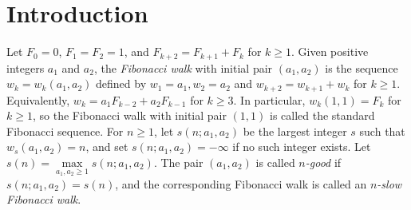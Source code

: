 \documentclass[11pt]{amsart}
\theoremstyle{definition}
\begin{document}
\begin{abstract}
Let $F_1=F_2=1$ and $F_{t+2}=F_{t+1}+F_t$ for $t\geq1$. For every $n\geq2$, there are unique integers $a,b,t$ such that $n=aF_t+bF_{t-1}$ with $t\geq2$ and $1\leq a\leq b\leq F_t$. The Fibonacci walk with initial pair $(b,a)$ reaches $n$ as late as possible, and the term following $n$ in this walk is $\lfloor\phi n\rfloor$ when $t$ is even and $\lceil\phi n\rceil$ when $t$ is odd, where $\phi=(1+\sqrt5)/2$. Let $D=\{d_1<d_2<\cdots\}$ and $U=\{u_1<u_2<\cdots\}$ be the sets corresponding to even and odd $t$, respectively. For $\ell,m\geq1$, define $D_\ell=\{d_{k+\ell}-d_k:k\geq1\}$, $U_\ell=\{u_{k+\ell}-u_k:k\geq1\}$, $D_\ell(m)=\{d_k:d_{k+\ell}-d_k=m\}$ and $U_\ell(m)=\{u_k:u_{k+\ell}-u_k=m\}$. Chung, Graham and Spiro conjectured that $D_\ell=U_\ell$ for all $\ell$, and asked for the densities of $D_\ell(m)$ and $U_\ell(m)$, especially when $\ell=1$. In this paper, we determine the third and fourth order gap spectra, and show that the conjecture holds for $\ell=3$ but fails for $\ell=4$. We also answer their density question by characterizing when $D_\ell(m)$ and $U_\ell(m)$ have natural densities and proving that their logarithmic densities always exist and are equal. For $\ell=1$, we give the exact logarithmic densities.

: Fibonacci sequence; slow Fibonacci walk; density\\
: 11B39; 11B05
\end{abstract}	

\maketitle
\pagestyle{plain}
\thispagestyle{plain}




\section{Introduction}
Let $F_0=0$, $F_1=F_2=1$, and $F_{k+2}=F_{k+1}+F_k$ for $k\geq1$. Given positive integers $a_1$ and $a_2$, the \emph{Fibonacci walk} with initial pair $(a_1,a_2)$ is the sequence $w_k=w_k(a_1,a_2)$ defined by $w_1=a_1,w_2=a_2$ and $w_{k+2}=w_{k+1}+w_k$ for $k\geq1$. Equivalently, $w_k=a_1F_{k-2}+a_2F_{k-1}$ for $k\geq3$. In particular, $w_k(1,1)=F_k$ for $k\geq1$, so the Fibonacci walk with initial pair $(1,1)$ is called the standard Fibonacci sequence. For $n\geq1$, let $s(n;a_1,a_2)$ be the largest integer $s$ such that $w_s(a_1,a_2)=n$, and set $s(n;a_1,a_2)=-\infty$ if no such integer exists. Let $s(n)=\max\limits_{a_1,a_2\geq 1}s(n;a_1,a_2)$. The pair $(a_1,a_2)$ is called \emph{$n$-good} if $s(n;a_1,a_2)=s(n)$, and the corresponding Fibonacci walk is called an \emph{$n$-slow Fibonacci walk}.
\end{document}
